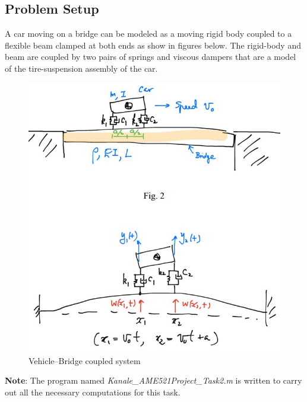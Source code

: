 \documentclass[11pt, oneside]{article}   	%
\begin{document}
\subsection{Problem Setup}
A car moving on a bridge can be modeled as a moving rigid body coupled to a flexible beam clamped at both ends as show in figures below. The rigid-body and beam are coupled by two pairs of springs and viscous dampers that are a model of the tire-suspension assembly of the car.
\begin{figure}[!htbp]
\centering
\includegraphics[scale=0.8]{VehicleBridgeModel}
\caption{Vehicle--Bridge coupled system}
\end{figure}

\textbf{Note}: The program named \textit{Kanale\_AME521Project\_Task2.m} is written to carry out all the necessary computations for this task.
\end{document}
